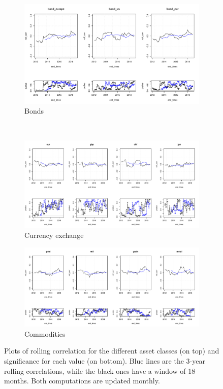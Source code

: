 \begin{figure}
	\begin{subfigure}{0.66\textwidth}
		\centering
		\includegraphics[width=0.8\linewidth]{Images/rolling_bonds}
		\caption{Bonds}
		\label{roll_bonds}
	\end{subfigure}\\
	\begin{subfigure}{\textwidth}
		\centering
		\includegraphics[width=0.8\linewidth]{Images/rolling_fx}
		\caption{Currency exchange}
		\label{roll_currencies}
	\end{subfigure}
	\begin{subfigure}{\textwidth}
		\centering
		\includegraphics[width=0.8\linewidth]{Images/rolling_commodities}
		\caption{Commodities}
		\label{roll_commodities}
	\end{subfigure}
	\caption[Plots of rolling correlations]{Plots of rolling correlation for the different asset classes (on top) and significance for each value (on bottom). Blue lines are the 3-year rolling correlations, while the black ones have a window of 18 months. Both computations are updated monthly.}
	\label{roll_corr}
\end{figure}


